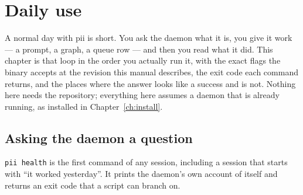 \chapter{Daily use}

\label{ch:daily}

A normal day with pii is short. You ask the daemon what it is, you give it work --- a
prompt, a graph, a queue row --- and then you read what it did. This chapter is that loop
in the order you actually run it, with the exact flags the binary accepts at the revision
this manual describes, the exit code each command returns, and the places where the answer
looks like a success and is not. Nothing here needs the repository; everything here assumes
a daemon that is already running, as installed in Chapter~\ref{ch:install}.

\begin{center}
\end{center}

\section{Asking the daemon a question}

\texttt{pii health} is the first command of any session, including a session that starts
with \enquote{it worked yesterday}. It prints the daemon's own account of itself and
returns an exit code that a script can branch on.

